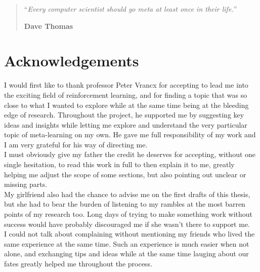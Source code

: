 \documentclass[11pt,a4paper,oneside]{book}
\begin{document}

\begin{quotation}
\noindent ``\emph{Every computer scientist should go meta at least once in
	their life.}''
\begin{flushright}\textbf{Dave Thomas}\end{flushright}
\end{quotation}

\medskip


\chapter*{Acknowledgements}
\thispagestyle{empty} 

\noindent I would first like to thank professor Peter Vrancx for accepting
to lead me into the exciting field of reinforcement learning, and for finding
a topic that was so close to what I wanted to explore while at the same
time being at the bleeding edge of research. Throughout the project, he
supported me by suggesting key ideas and insights while letting me explore
and understand the very particular topic of meta-learning on my own. He
gave me full responsibility of my work and I am very grateful for his way 
of directing me.\\

I must obviously give my father the credit he deserves for accepting, without
one single hesitation, to read this work in full to then explain it to me,
greatly helping me adjust the scope of some sections, but also pointing out
unclear or missing parts.\\

My girlfriend also had the chance to advise me on the first drafts of this 
thesis, but she had to bear the burden of listening to my rambles at
the most barren points of my research too. Long days of trying to make something
work without success would have probably discouraged me if she wasn't there
to support me.\\

I could not talk about complaining without mentioning my friends who lived the
same experience at the same time. Such an experience is much easier when not
alone, and exchanging tips and ideas while at the same time lauging about
our fates greatly helped me throughout the process.
\end{document}
